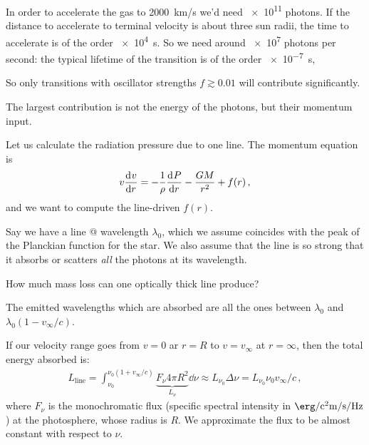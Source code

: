 \documentclass[main.tex]{subfiles}
\begin{document}
In order to accelerate the gas to \SI{2000}{km/s} we'd need \num{e11} photons.
If the distance to accelerate to terminal velocity is about three sun radii, the time to accelerate is of the order \SI{e4}{s}.
So we need around \num{e7} photons per second: the typical lifetime of the transition is of the order \SI{e-7}{s}, 

So only transitions with oscillator strengths \(f \gtrsim 0.01\) will contribute significantly.


The largest contribution is not the energy of the photons, but their momentum input.

Let us calculate the radiation pressure due to one line. The momentum equation is 
%
\begin{align}
  v \dv[]{v}{r} = - \frac{1}{\rho } \dv[]{P}{r} - \frac{GM}{r^2} + f(r)
\,,
\end{align}
%
and we want to compute the line-driven \(f(r)\).

Say we have a line @ wavelength \(\lambda_0 \),  which we assume coincides with the peak of the Planckian function for the star.
We also assume that the line is so strong that it absorbs or scatters \emph{all} the photons at its wavelength.


How much mass loss can one optically thick line produce? 

The emitted wavelengths which are absorbed are all the ones between \(\lambda_0\) and \(\lambda_0 (1 - v_{\infty}/c)\).

If our velocity range goes from \(v=0\) ar \(r = R\) to \(v = v_{\infty}\) at \(r = \infty\), then the total energy absorbed is: 
%
\begin{align}
  L _{\text{line}} = \int _{\nu_0 }^{\nu_0 (1 + v_{\infty}/c)} \underbrace{F_\nu 4 \pi R^2}_{{L_{\nu}}} \dd{\nu } \approx L_{\nu_0 } \Delta \nu = L_{\nu_0 } \nu_0 v_{\infty} /c
\,,
\end{align}
%
where \(F_{\nu }\) is the monochromatic flux (specific spectral intensity in \(\SI{}{\erg\per\square\centi\metre\per\second\per\hertz}\)) at the photosphere, whose radius is \(R\).
We approximate the flux to be almost constant with respect to \(\nu \).
\end{document}

